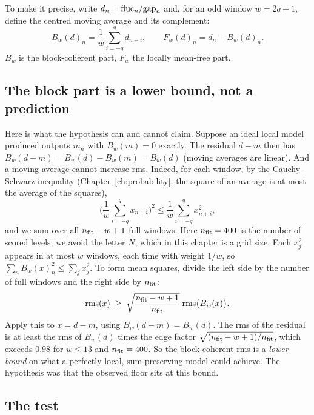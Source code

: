 To make it precise, write $d_n=\mathrm{fluc}_n/\mathrm{gap}_n$ and, for an odd window $w=2q+1$, define the centred moving average and its complement:
\begin{equation}
B_w(d)_n=\frac1w\sum_{i=-q}^{q}d_{n+i},\qquad F_w(d)_n=d_n-B_w(d)_n .\label{eq:paper-spurious-floor-BF}
\end{equation}
$B_w$ is the block-coherent part, $F_w$ the locally mean-free part.

\subsection{The block part is a lower bound, not a prediction}

Here is what the hypothesis can and cannot claim. Suppose an ideal local model produced outputs $m_n$ with $B_w(m)=0$ exactly. The residual $d-m$ then has $B_w(d-m)=B_w(d)-B_w(m)=B_w(d)$ (moving averages are linear). And a moving average cannot increase rms. Indeed, for each window, by the Cauchy--Schwarz inequality (Chapter~\ref{ch:probability}: the square of an average is at most the average of the squares),
\begin{equation}
\Big(\frac1w\sum_{i=-q}^{q}x_{n+i}\Big)^2\le\frac1w\sum_{i=-q}^{q}x_{n+i}^2 ,\label{eq:paper-spurious-floor-CS}
\end{equation}
and we sum over all $n_{\rm fit}-w+1$ full windows. Here $n_{\rm fit}=400$ is the number of scored levels; we avoid the letter $N$, which in this chapter is a grid size. Each $x_j^2$ appears in at most $w$ windows, each time with weight $1/w$, so $\sum_n B_w(x)_n^2\le\sum_jx_j^2$. To form mean squares, divide the left side by the number of full windows and the right side by $n_{\rm fit}$:
\begin{equation}
\mathrm{rms}(x)\;\ge\;\sqrt{\frac{n_{\rm fit}-w+1}{n_{\rm fit}}}\;\mathrm{rms}\big(B_w(x)\big).\label{eq:paper-spurious-floor-edge}
\end{equation}
Apply this to $x=d-m$, using $B_w(d-m)=B_w(d)$. The rms of the residual is at least the rms of $B_w(d)$ times the edge factor $\sqrt{(n_{\rm fit}-w+1)/n_{\rm fit}}$, which exceeds $0.98$ for $w\le13$ and $n_{\rm fit}=400$. So the block-coherent rms is a \emph{lower bound} on what a perfectly local, sum-preserving model could achieve. The hypothesis was that the observed floor sits at this bound.

\subsection{The test}

